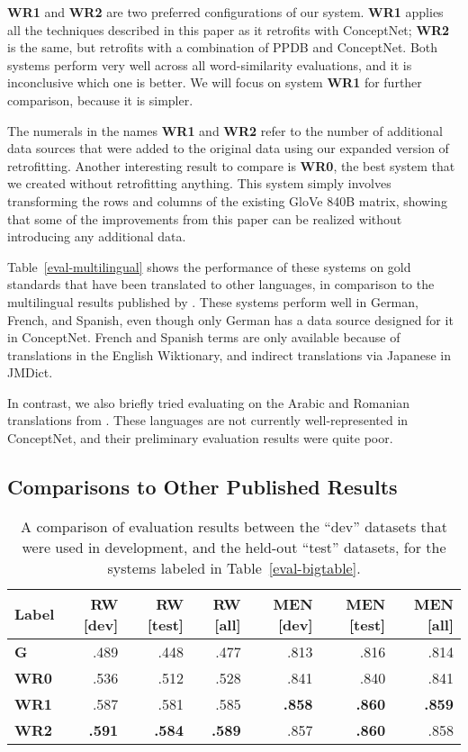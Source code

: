 \documentclass[11pt]{article}
\begin{document}
{\bf WR1} and {\bf WR2} are two preferred configurations of our system. {\bf WR1}
applies all the techniques described in this paper as it retrofits with
ConceptNet; {\bf WR2} is the same, but retrofits with a combination of PPDB and
ConceptNet. Both systems perform very well across all word-similarity
evaluations, and it is inconclusive which one is better. We will focus on
system {\bf WR1} for further comparison, because it is simpler.

The numerals in the names {\bf WR1} and {\bf WR2} refer to the number of
additional data sources that were added to the original data using our expanded
version of retrofitting. Another interesting result to compare is {\bf WR0},
the best system that we created without retrofitting anything. This system
simply involves transforming the rows and columns of the existing GloVe 840B
matrix, showing that some of the improvements from this paper can be realized
without introducing any additional data.

Table~\ref{eval-multilingual} shows the performance of these systems on
gold standards that have been translated to other languages, in comparison to
the multilingual results published by .
These systems perform well in German, French, and Spanish, even though only
German has a data source designed for it in ConceptNet. French and Spanish terms
are only available because of translations in the English Wiktionary, and
indirect translations via Japanese in JMDict.

In contrast, we also briefly tried evaluating on the Arabic and Romanian
translations from . These languages are not
currently well-represented in ConceptNet, and their preliminary evaluation
results were quite poor.

\subsection{Comparisons to Other Published Results}

\begin{table*}[t]
\centering
\begin{tabular}{lrrrrrr}
\toprule
Label   & RW [dev] & RW [test] & RW [all] & MEN [dev] & MEN [test] & MEN [all]\\
\midrule
\bf G   &    .489  &    .448  &    .477  &    .813  &    .816 &    .814 \\
\bf WR0 &    .536  &    .512  &    .528  &    .841  &    .840 &    .841 \\
\bf WR1 &    .587  &    .581  &    .585  &\bf .858  &\bf .860 &\bf .859 \\
\bf WR2 &\bf .591  &\bf .584  &\bf .589  &    .857  &\bf .860 &    .858 \\
\bottomrule
\end{tabular}

\caption{
    A comparison of evaluation results between the ``dev'' datasets that were
    used in development, and the held-out ``test'' datasets, for the systems
    labeled in Table~\ref{eval-bigtable}.
}
\label{eval-dev-test}
\end{table*}
\end{document}
